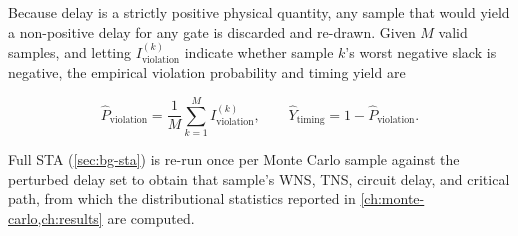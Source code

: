 Because delay is a strictly positive physical quantity, any sample that
would yield a non-positive delay for any gate is discarded and re-drawn.
Given $M$ valid samples, and letting $I^{(k)}_{\mathrm{violation}}$
indicate whether sample $k$'s worst negative slack is negative, the
empirical violation probability and timing yield are

\begin{equation}
    \hat{P}_{\mathrm{violation}} = \frac{1}{M}\sum_{k=1}^{M} I^{(k)}_{\mathrm{violation}}, \qquad
    \hat{Y}_{\mathrm{timing}} = 1 - \hat{P}_{\mathrm{violation}}.
    \label{eq:mc-yield}
\end{equation}

Full STA (\cref{sec:bg-sta}) is re-run once per Monte Carlo sample against
the perturbed delay set to obtain that sample's WNS, TNS, circuit delay, and
critical path, from which the distributional statistics reported in
\cref{ch:monte-carlo,ch:results} are computed.

